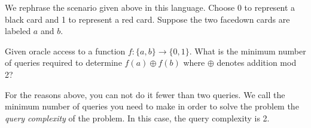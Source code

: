         We rephrase the scenario given above in this language.  Choose 0 to represent a black card and 1 to
        represent a red card. Suppose the two facedown cards are labeled $a$ and $b$.   
       
        \begin{example} 
            Given oracle access to a function $f: \{a, b\} \rightarrow \{0, 1\}$. What is the minimum number of
            queries required to determine $f(a) \oplus f(b)$ where $\oplus$ denotes addition mod 2?
        \end{example}

        For the reasons above, you can not do it fewer than two queries. We call the minimum number of queries you 
        need to make in order to solve the problem the \emph{query complexity} of the problem. In this case, the 
        query complexity is 2.




        





